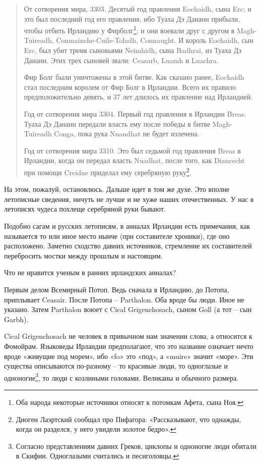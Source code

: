 \begin{quotation}
От сотворения мира, 3303. Десятый год правления Eochaidh, сына Erc; и это был последний год его правления, ибо Туаха Дэ Дананн прибыли, чтобы отбить Ирландию у Фирболг\footnote{Оба народа некоторые источники относят к потомкам Афета, сына Ноя.}; и они воевали друг с другом в Magh-Tuireadh, Conmainche-Cuile-Toladh, Connaught. И король Eochaidh, сын Erc, был убит тремя сыновьями Neimhidh, сына Badhrai, из Туаха Дэ Дананн. Этих трех сыновей звали: Ceasarb, Luamh и Luachra.

Фир Болг были уничтожены в этой битве. Как сказано ранее, Eochaidh стал последним королем от Фир Болг в Ирландии. Всего их правило предположительно девять, и 37 лет длилось их правление над Ирландией.

Год от сотворения мира 3304. Первый год правления в Ирландии Breas. Туаха Дэ Дананн передали власть ему после победы в битве Magh-Tuireadh Conga, пока рука Nuandhat не будет излечена. 

Год от сотворения мира 3310. Это был седьмой год правления Breas в Ирландии, когда он передал власть Nuadhat, после того, как Diancecht при помощи Creidne приделал ему серебряную руку\footnote{Диоген Лаэртский сообщал про Пифагора: «Рассказывают, что однажды, когда он разделся, у него увидели золотое бедро».}.\end{quotation}

На этом, пожалуй, остановлюсь. Дальше идет в том же духе. Это вполне летописные сведения, ничуть не лучше и не хуже наших отечественных. У нас в летописях чудеса похлеще серебряной руки бывают.

Подобно сагам и русских летописям, в анналах Ирландии есть примечания, как называется то или иное место нынче (при составителе хроники), где оно расположено. Заметно сходство давних источников, стремление их составителей перебросить мостки между прошлым и настоящим.
 
Что не нравится ученым в ранних ирландских анналах?

Первым делом Всемирный Потоп. Ведь сначала в Ирландию, до Потопа, приплывает Ceasair. После Потопа – Parthalon. Оба вроде бы люди. Иное не указано. Затем Parthalon воюет с Cical Grigenchosach, сыном Goll (а тот – сын Garbh).

Cical Grigenchosach не человек в привычном нам значении слова, а относится к Фомойрам. Языковеды Ирландии предполагают, что это название означает нечто вроде «живущие под морем», ибо «fo» это «под», а «muire» значит «море». Эти существа описываются по-разному – то красивые люди, то одноглазые и одноногие\footnote{Согласно представлениям давних Греков, циклопы и одноногие люди обитали в Скифии. Одноглазыми считались и песиголовцы.}, то люди с козлиными головами. Великаны и обычного размера.

